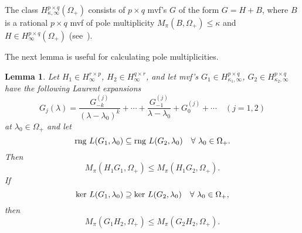 \documentclass[12pt,twoside,a4paper]{amsart}
\newtheorem{lem}[thm]{Lemma}
\theoremstyle{definition}
\numberwithin{equation}{section}
\begin{document}
The class $H_{\kappa,\infty}^{p\times q}(\Omega_+)$ consists of
$p\times q$ mvf's $G$ of the form $G=H+B$, where $B$ is a rational
$p\times q$ mvf of pole multiplicity $M_{\pi}(B, \Omega_+)\le\kappa$
and $H\in H_{\infty}^{p\times q}(\Omega_+)$ (see~\cite{AAK71}).

The next lemma is useful for calculating
pole multiplicities.
\begin{lem}\label{lem:7.7}
Let  $H_1\in H_{\infty}^{r\times p}$, $H_2\in H_{\infty}^{q\times
r}$, and let mvf's $G_1\in H_{\kappa_1,\infty}^{p\times q}$, $G_2\in
H_{\kappa_2,\infty}^{p\times q}$ have the following Laurent expansions
\begin{equation}\label{Gexp1}
    G_j(\lambda)=\frac{G_{-k}^{(j)}}{(\lambda-\lambda_0)^{k}}+\cdots
+\frac{G_{-1}^{(j)}}{\lambda-\lambda_0}+G_0^{(j)}+\cdots\quad
(j=1,2)
\end{equation}
at $\lambda_0\in\Omega_+$ and let
\begin{equation}\label{M1}
   \textup{rng }L(G_1,\lambda_0)\subseteq \textup{rng }L(G_2,\lambda_0)\quad\forall \  \lambda_0\in\Omega_+.
\end{equation}
Then
\begin{equation}\label{M2}
    M_{\pi} (H_1G_1, \Omega_+)\le M_{\pi} (H_1G_2, \Omega_+).
\end{equation}
If
\begin{equation}\label{M3}
   \textup{ker }L(G_1,\lambda_0)\supseteq \textup{ker }L(G_2,\lambda_0)\quad\forall \  \lambda_0\in\Omega_+,
\end{equation}
then
\begin{equation}\label{M4}
    M_{\pi} (G_1H_2, \Omega_+)\le M_{\pi} (G_2H_2, \Omega_+).
\end{equation}
 \end{lem}
\end{document}
